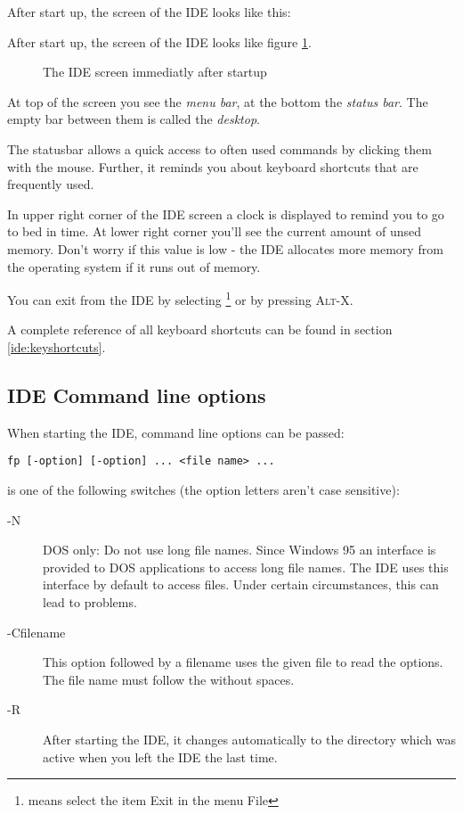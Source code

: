 \begin{htmlonly}
After start up, the screen of the IDE looks like this:
\end{htmlonly}
\begin{latexonly}
After start up, the screen of the IDE looks like figure \ref{fig:idestart}.
\begin{figure}
\caption{The IDE screen immediatly after startup}
\label{fig:idestart}
\ifpdf
{}
\else
\fi
\end{figure}
\end{latexonly}
At top of the screen you see the \emph{menu bar}, at the bottom
the \emph{status bar}. The empty bar between them is called the
\emph{desktop}.

The statusbar allows a quick access to often used commands by
clicking them with the mouse. Further, it reminds you about 
keyboard shortcuts that are frequently used.

In upper right corner of the IDE screen a clock is displayed to
remind you to go to bed in time. At lower right corner you'll
see the current amount of unsed memory. Don't worry if this value
is low - the IDE allocates more memory from the operating system
if it runs out of memory.

You can exit from the IDE by selecting 
\footnote{ means select the item Exit in the menu File}
or by pressing \textsc{Alt-X}.

\begin{remark}
A complete reference of all keyboard shortcuts can be found in
section \ref{ide:keyshortcuts}.
\end{remark}

\subsection{IDE Command line options}

When starting the IDE, command line options can be passed:
\begin{verbatim}
fp [-option] [-option] ... <file name> ...
\end{verbatim}

 is one of the following switches (the option letters
aren't case sensitive):

\begin{description}
\item [-N] DOS only: Do not use long file names. Since Windows 95 an interface
is provided to DOS applications to access long file names. The IDE uses
this interface by default to access files. Under certain circumstances, this
can lead to problems.
\item [-Cfilename] This option followed by
a filename uses the given file to read the options. The file name
must follow the  without spaces.
\item [-R] After starting the IDE, it changes automatically to the directory
which was active when you left the IDE the last time.
\end{description}

